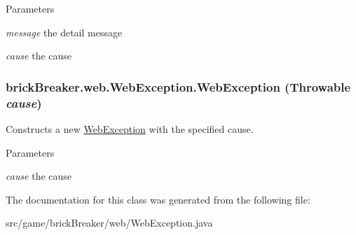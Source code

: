 \begin{DoxyParams}{Parameters}
\item[{\em message}]the detail message \item[{\em cause}]the cause \end{DoxyParams}
\hypertarget{classbrick_breaker_1_1web_1_1_web_exception_a0fec67ad1b856715b5c5d9505fa65506}{
\subsubsection[{WebException}]{\setlength{\rightskip}{0pt plus 5cm}brickBreaker.web.WebException.WebException (Throwable {\em cause})}}
\label{classbrick_breaker_1_1web_1_1_web_exception_a0fec67ad1b856715b5c5d9505fa65506}
Constructs a new {\ttfamily \hyperlink{classbrick_breaker_1_1web_1_1_web_exception}{WebException}} with the specified cause.


\begin{DoxyParams}{Parameters}
\item[{\em cause}]the cause \end{DoxyParams}


The documentation for this class was generated from the following file:\begin{DoxyCompactItemize}
\item 
src/game/brickBreaker/web/WebException.java\end{DoxyCompactItemize}
